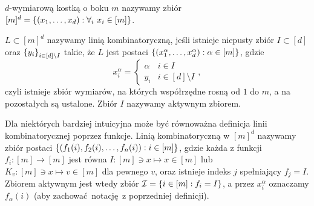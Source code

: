 \begin{definition}
	\(d\)-wymiarową kostką o boku \(m\) nazywamy zbiór \([m]^d = \set{(x_1,\ldots,x_d) : \forall_i \ x_i \in [m]}\).
\end{definition}

\begin{definition}
	\(L\subset [m]^d\) nazywamy linią kombinatoryczną, jeśli istnieje niepusty zbiór \(I\subset[d]\) oraz \(\set{y_i}_{i\in[d]\setminus I}\) takie, że \(L\) jest postaci \(\set{(x_1^\alpha,\ldots,x_d^\alpha) : \alpha\in[m]}\), gdzie \[x_i^\alpha = \left\{ \begin{array}{lr}
			\alpha & i\in I             \\
			y_i    & i\in[d]\setminus I
		\end{array} \right.,\]
	czyli istnieje zbiór wymiarów, na których współrzędne rosną od \(1\) do \(m\), a na pozostałych są ustalone. Zbiór \(I\) nazywamy aktywnym zbiorem.
\end{definition}

\begin{definition}
	Dla niektórych bardziej intuicyjna może być równoważna definicja linii kombinatorycznej poprzez funkcje.
	Linią kombinatoryczną w \([m]^d\) nazywamy zbiór postaci \(\set{(f_1(i), f_2(i), \ldots, f_n(i)) : i \in [m]}\),
	gdzie każda z funkcji \(f_i : [m] \to [m]\) jest równa \(I : [m] \ni x \mapsto x \in [m]\) lub \(K_v :
	[m] \ni x \mapsto v \in [m]\) dla pewnego \(v\), oraz istnieje indeks \(j\) spełniający \(f_j = I\).
	Zbiorem aktywnym jest wtedy zbiór \(\mathcal{I} = \set{i \in [m]: f_i = I}\),
	a przez \(x_i^{\alpha}\) oznaczamy \(f_{\alpha}(i)\) (aby zachować notację z poprzedniej definicji).
\end{definition}

